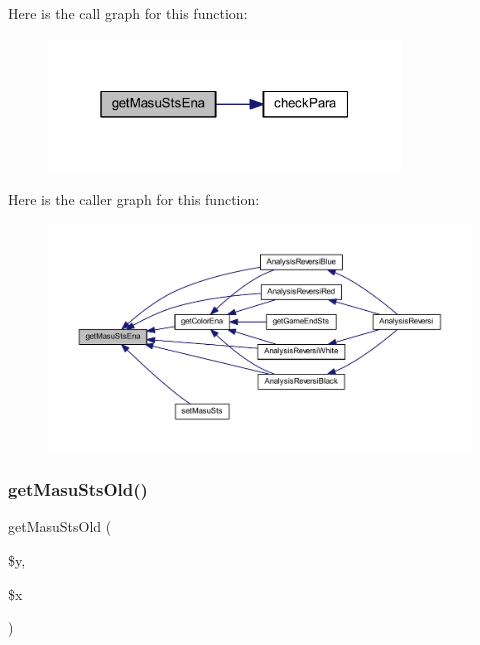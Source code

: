 Here is the call graph for this function\+:\nopagebreak
\begin{figure}[H]
\begin{center}
\leavevmode
\includegraphics[width=265pt]{class_reversi_a22088e18c7f837f49093595261c30e4e_cgraph}
\end{center}
\end{figure}
Here is the caller graph for this function\+:\nopagebreak
\begin{figure}[H]
\begin{center}
\leavevmode
\includegraphics[width=350pt]{class_reversi_a22088e18c7f837f49093595261c30e4e_icgraph}
\end{center}
\end{figure}
\mbox{\label{class_reversi_a1688a929d3917e19510f6501c42d6a2b}} 
\subsubsection{\texorpdfstring{get\+Masu\+Sts\+Old()}{getMasuStsOld()}}
{\footnotesize\ttfamily get\+Masu\+Sts\+Old (\begin{DoxyParamCaption}\item[{}]{\$y,  }\item[{}]{\$x }\end{DoxyParamCaption})}



